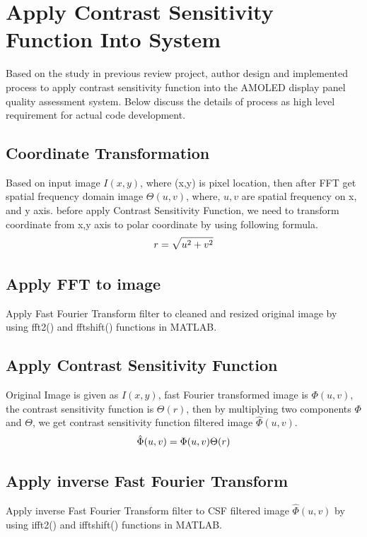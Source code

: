 \documentclass{article}
\begin{document}
\section{Apply Contrast Sensitivity Function Into System}
Based on the study in previous review project, author design and implemented process to apply contrast sensitivity function into the AMOLED display panel quality assessment system. Below discuss the details of process as high level requirement for actual code development.
\subsection{Coordinate Transformation}
Based on input image $I(x,y)$, where (x,y) is pixel location, then after FFT get spatial frequency domain image $\Theta(u,v)$, where, $u,v$ are spatial frequency on x, and y axis. before apply Contrast Sensitivity Function, we need to transform coordinate from x,y axis to polar coordinate by using following formula.
\begin{equation}
    \centering
    \label{eq:coor}
     r = \sqrt{u^2+v^2}
\end{equation}

\subsection{Apply FFT to image}
Apply Fast Fourier Transform filter to cleaned and resized original image by using fft2() and fftshift() functions in MATLAB.

\subsection{Apply Contrast Sensitivity Function}
Original Image is given as $I(x,y)$, fast Fourier transformed image is $\Phi(u,v)$, the contrast sensitivity function is $\Theta(r)$, then by multiplying two components $\Phi$ and $\Theta$, we get contrast sensitivity function filtered image $\hat{\Phi}(u,v)$.
\begin{equation}
    \centering
    \label{eq:applyCSF}
    \hat{\Phi}(u,v) = \Phi(u,v)\Theta(r)
\end{equation}
\subsection{Apply inverse Fast Fourier Transform}
Apply inverse Fast Fourier Transform filter to CSF filtered image $\hat{\Phi}(u,v)$ by using ifft2() and ifftshift() functions in MATLAB.
\end{document}
